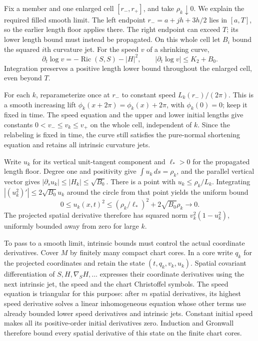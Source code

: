 Fix a member and one enlarged cell $[r_-,r_+]$, and take
$\rho_k\downarrow0$.  We explain the required filled smooth limit.
The left endpoint $r_-=a+jh+3h/2$ lies in $[a,T]$, so the
earlier length floor applies there.  The right endpoint can exceed
$T$; its lower length bound must instead be propagated.  On this
whole cell let $B_i$ bound the squared $i$th curvature jet.
For the speed $v$ of a shrinking curve,
\[
 \partial_t\log v=-\operatorname{Ric}(S,S)-|H|^2,
 \qquad |\partial_t\log v|\le K_2+B_0.
\]
Integration preserves a positive length lower bound throughout
the enlarged cell, even beyond $T$.

For each $k$, reparameterize once at $r_-$ to constant speed
$L_k(r_-)/(2\pi)$.  This is a smooth increasing lift
$\phi_k(x+2\pi)=\phi_k(x)+2\pi$, with $\phi_k(0)=0$;
keep it fixed in time.  The speed equation and the upper and
lower initial lengths give constants $0<v_-\le v_k\le v_+$
on the whole cell, independent of $k$.  Since the relabeling
is fixed in time, the curve still satisfies the pure-normal
shortening equation and retains all intrinsic curvature jets.

Write $u_k$ for its vertical unit-tangent component and $\ell_*>0$
for the propagated length floor.  Degree one and positivity give
$\int u_k\,ds=\rho_k$, and the parallel vertical vector gives
$|\partial_su_k|\le |H_k|\le\sqrt{B_0}$.  There is a point
with $u_k\le\rho_k/L_k$.  Integrating
$|(u_k^2)'|\le2\sqrt{B_0}u_k$ around the circle from that point
yields the uniform bound
\[
 0\le u_k(x,t)^2\le (\rho_k/\ell_*)^2
                       +2\sqrt{B_0}\rho_k\longrightarrow0.
\]
The projected spatial derivative therefore has squared norm
$v_k^2(1-u_k^2)$, uniformly bounded away from zero for large $k$.

To pass to a smooth limit, intrinsic bounds must control the
actual coordinate derivatives.  Cover $M$ by finitely many
compact chart cores.  In a core write $q_k$ for the projected
coordinates and retain the state $(t,q_k,v_k,u_k)$.  Spatial
covariant differentiation of $S,H,\nabla_SH,\ldots$ expresses
their coordinate derivatives using the next intrinsic jet,
the speed and the chart Christoffel symbols.  The speed
equation is triangular for this purpose: after $m$ spatial
derivatives, its highest speed derivative solves a linear
inhomogeneous equation whose other terms use already bounded
lower speed derivatives and intrinsic jets.  Constant initial
speed makes all its positive-order initial derivatives zero.
Induction and Gronwall therefore bound every spatial derivative
of this state on the finite chart cores.

